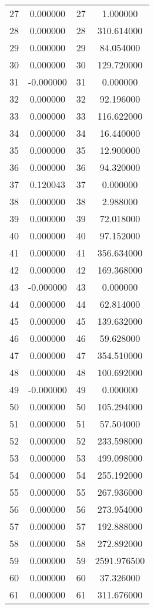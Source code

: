 \documentclass[12pt]{article}
\begin{document}
\begin{longtable}{@{}cccc@{}}
27 & 0.000000 & 27 & 1.000000 \\
28 & 0.000000 & 28 & 310.614000 \\
29 & 0.000000 & 29 & 84.054000 \\
30 & 0.000000 & 30 & 129.720000 \\
31 & -0.000000 & 31 & 0.000000 \\
32 & 0.000000 & 32 & 92.196000 \\
33 & 0.000000 & 33 & 116.622000 \\
34 & 0.000000 & 34 & 16.440000 \\
35 & 0.000000 & 35 & 12.900000 \\
36 & 0.000000 & 36 & 94.320000 \\
37 & 0.120043 & 37 & 0.000000 \\
38 & 0.000000 & 38 & 2.988000 \\
39 & 0.000000 & 39 & 72.018000 \\
40 & 0.000000 & 40 & 97.152000 \\
41 & 0.000000 & 41 & 356.634000 \\
42 & 0.000000 & 42 & 169.368000 \\
43 & -0.000000 & 43 & 0.000000 \\
44 & 0.000000 & 44 & 62.814000 \\
45 & 0.000000 & 45 & 139.632000 \\
46 & 0.000000 & 46 & 59.628000 \\
47 & 0.000000 & 47 & 354.510000 \\
48 & 0.000000 & 48 & 100.692000 \\
49 & -0.000000 & 49 & 0.000000 \\
50 & 0.000000 & 50 & 105.294000 \\
51 & 0.000000 & 51 & 57.504000 \\
52 & 0.000000 & 52 & 233.598000 \\
53 & 0.000000 & 53 & 499.098000 \\
54 & 0.000000 & 54 & 255.192000 \\
55 & 0.000000 & 55 & 267.936000 \\
56 & 0.000000 & 56 & 273.954000 \\
57 & 0.000000 & 57 & 192.888000 \\
58 & 0.000000 & 58 & 272.892000 \\
59 & 0.000000 & 59 & 2591.976500 \\
60 & 0.000000 & 60 & 37.326000 \\
61 & 0.000000 & 61 & 311.676000 \\

\end{longtable}
\end{document}
